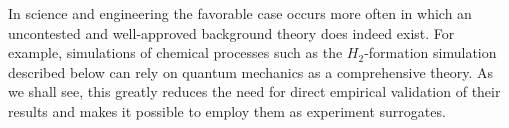 \documentclass[12pt, a4paper]{article}
\newcommand{\jk}[1]{\blue\textsf{JK: #1 }\black}
\newcommand{\jka}[1]{\blue\textsf{JK comment: #1 }\black}
\newcommand{\ea}[1]{\color{darkgreen}\textsf{EA: #1 }\black}
\numberwithin{equation}{section}
\begin{document}

In science and engineering the favorable case occurs more often in
which an uncontested and well-approved background theory does indeed
exist. For example, simulations of chemical processes such as the
$H_2$-formation simulation described below can rely on quantum
mechanics as a comprehensive theory. As we shall see, this greatly
reduces the need for direct empirical validation of their results and
makes it possible to employ them as experiment surrogates.
  
\end{document}
